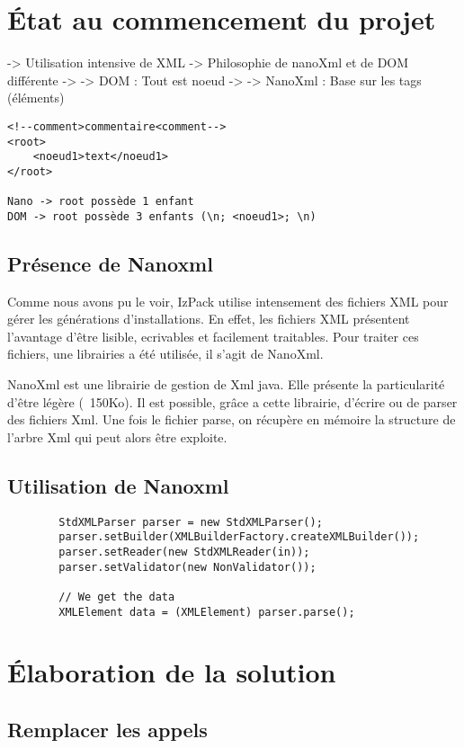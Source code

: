 \section{État au commencement du projet}
-> Utilisation intensive de XML
-> Philosophie de nanoXml et de DOM différente
-> -> DOM : Tout est noeud
-> -> NanoXml : Base sur les tags (éléments)
\begin{verbatim}
<!--comment>commentaire<comment-->
<root>
	<noeud1>text</noeud1>
</root>

Nano -> root possède 1 enfant
DOM -> root possède 3 enfants (\n; <noeud1>; \n)
\end{verbatim}
\subsection{Présence de Nanoxml}
Comme nous avons pu le voir, IzPack utilise intensement des fichiers XML pour gérer les générations d'installations. En effet, les fichiers XML présentent l'avantage d'être lisible, ecrivables et facilement traitables. Pour traiter ces fichiers, une librairies a été utilisée, il s'agit de NanoXml.

NanoXml est une librairie de gestion de Xml java. Elle présente la particularité d'être légère (~150Ko). Il est possible, grâce a cette librairie, d'écrire ou de parser des fichiers Xml. Une fois le fichier parse, on récupère en mémoire la structure de l'arbre Xml qui peut alors être exploite.

\subsection{Utilisation de Nanoxml}
\begin{verbatim}
        StdXMLParser parser = new StdXMLParser();
        parser.setBuilder(XMLBuilderFactory.createXMLBuilder());
        parser.setReader(new StdXMLReader(in));
        parser.setValidator(new NonValidator());

        // We get the data
        XMLElement data = (XMLElement) parser.parse();
\end{verbatim}

\section{Élaboration de la solution}
\subsection{Remplacer les appels}
